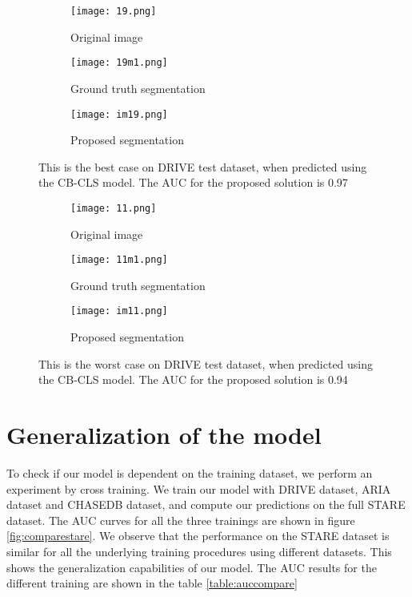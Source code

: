 \begin{figure}
	\centering
	\begin{subfigure}[b]{0.3\textwidth}
		\texttt{[image: 19.png]}
		\caption{Original image}
		\label{fig:191}
	\end{subfigure}
	\begin{subfigure}[b]{0.3\textwidth}
		\texttt{[image: 19m1.png]}
		\caption{Ground truth segmentation}
		\label{fig:192}
	\end{subfigure}
	\begin{subfigure}[b]{0.3\textwidth}
		\texttt{[image: im19.png]}
		\caption{Proposed segmentation}
		\label{fig:193}
	\end{subfigure}
	\caption[Best case on DRIVE test dataset using cluster learning]{This is the best case on DRIVE test dataset, when predicted using the CB-CLS model. The AUC for the proposed solution is 0.97}
	\label{fig:bestcase}
\end{figure}

\begin{figure}
	\centering
	\begin{subfigure}[b]{0.3\textwidth}
		\texttt{[image: 11.png]}
		\caption{Original image}
		\label{fig:111}
	\end{subfigure}
	\begin{subfigure}[b]{0.3\textwidth}
		\texttt{[image: 11m1.png]}
		\caption{Ground truth segmentation}
		\label{fig:112}
	\end{subfigure}
	\begin{subfigure}[b]{0.3\textwidth}
		\texttt{[image: im11.png]}
		\caption{Proposed segmentation}
		\label{fig:113}
	\end{subfigure}
	\caption[Worst case on DRIVE test dataset using cluster learning]{This is the worst case on DRIVE test dataset, when predicted using the CB-CLS model. The AUC for the proposed solution is 0.94}
	\label{fig:worstcase}
\end{figure}

\section{Generalization of the model}\label{sec:generalization}
To check if our model is dependent on the training dataset, we perform an experiment by cross training. We train our model with DRIVE dataset, ARIA dataset and CHASEDB dataset, and compute our predictions on the full STARE dataset.
The AUC curves for all the three trainings are shown in figure \ref{fig:comparestare}. We observe that the performance on the STARE dataset is similar for all the underlying training procedures using different datasets. This shows the generalization capabilities of our model. The AUC results for the different training are shown in the table \ref{table:auccompare}

